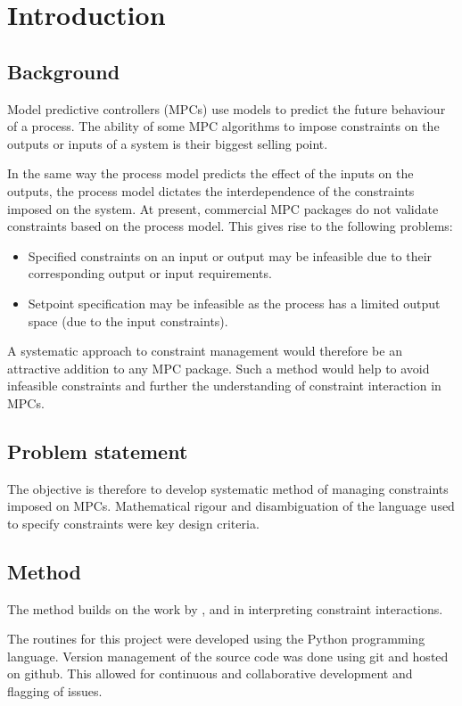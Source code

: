 \chapter{Introduction}\label{chap:intro}
\section{Background}
Model predictive controllers (MPCs) use models to predict the future behaviour of a process.
The ability of some MPC algorithms to impose constraints on the outputs or inputs of a system is their biggest selling point.

In the same way the process model predicts the effect of the inputs on the outputs, the process model dictates the interdependence of the constraints imposed on the system.
At present, commercial MPC packages do not validate constraints based on the process model.
This gives rise to the following problems:
\begin{itemize}
  \item Specified constraints on an input or output may be infeasible due to their corresponding output or input requirements.
  \item Setpoint specification may be infeasible as the process has a limited output space (due to the input constraints).
\end{itemize}

A systematic approach to constraint management would therefore be an attractive addition to any MPC package. 
Such a method would help to avoid infeasible constraints and further the understanding of constraint interaction in MPCs.

\section{Problem statement}
The objective is therefore to develop systematic method of managing constraints imposed on MPCs.
Mathematical rigour and disambiguation of the language used to specify constraints were key design criteria.

\section{Method}
The method builds on the work by \citet{vinsonphd}, \citet{limaphd} and \citet{opconproc} in interpreting constraint interactions.

The routines for this project were developed using the Python programming language.
Version management of the source code was done using git and hosted on github.
This allowed for continuous and collaborative development and flagging of issues.

